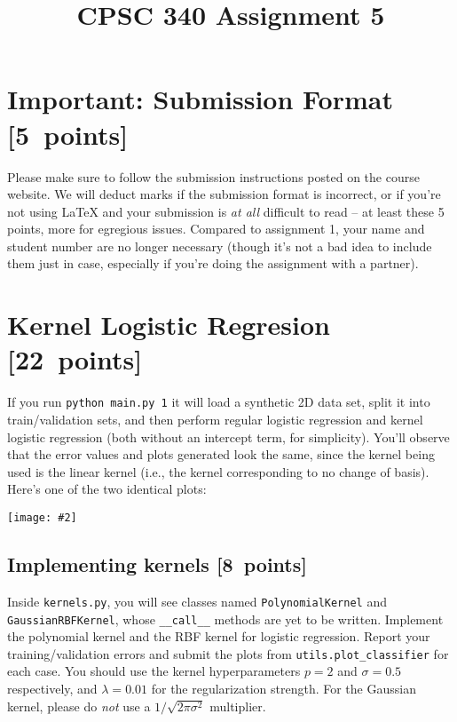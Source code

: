 \documentclass{article}
\newcommand{\blu}[1]{{\textcolor{blu}{#1}}}
\let\ask\blu
\newenvironment{asking}{\begingroup\color{blu}}{\endgroup}
\newcommand\pts[1]{\textcolor{pointscolour}{[#1~points]}}
\newcommand{\centerfig}[2]{\begin{center}\texttt{[image: \#2]}\end{center}}
\begin{document}
\title{CPSC 340 Assignment 5}
\author{}
\date{}
\maketitle
\vspace{-6em}

\section*{Important: Submission Format \pts{5}}

Please make sure to follow the submission instructions posted on the course website.
\ask{We will deduct marks if the submission format is incorrect, or if you're not using \LaTeX{} and your submission is \emph{at all} difficult to read} -- at least these 5 points, more for egregious issues.
Compared to assignment 1, your name and student number are no longer necessary (though it's not a bad idea to include them just in case, especially if you're doing the assignment with a partner).

\vspace{1em}



\section{Kernel Logistic Regresion \pts{22}}

If you run \verb|python main.py 1| it will load a synthetic 2D data set, split it into train/validation sets, and then perform regular logistic regression and kernel logistic regression (both without an intercept term, for simplicity). You'll observe that the error values and plots generated look the same, since the kernel being used is the linear kernel (i.e., the kernel corresponding to no change of basis). Here's one of the two identical plots:
\centerfig{0.5}{figs/logReg.png}


\subsection{Implementing kernels \pts{8}}

Inside \texttt{kernels.py}, you will see classes named \texttt{PolynomialKernel} and \texttt{GaussianRBFKernel}, whose \verb|__call__| methods are yet to be written.
\begin{asking}
  Implement the polynomial kernel and the RBF kernel for logistic regression.
  Report your training/validation errors and submit the plots from \verb|utils.plot_classifier| for each case.
\end{asking}
You should use the kernel hyperparameters $p=2$ and $\sigma=0.5$ respectively,
and $\lambda=0.01$ for the regularization strength.
For the Gaussian kernel, please do \emph{not} use a $1/\sqrt{2\pi\sigma^2}$ multiplier.
\newpage
\end{document}

